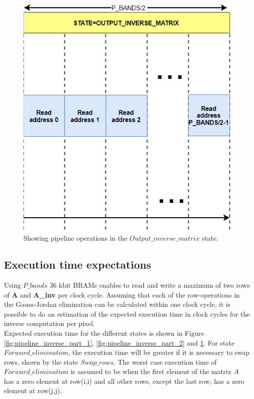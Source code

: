\begin{figure}[H]
\centering

   \includegraphics[scale=0.5]{images/estimation_execution_time/pipeline_inverse_matrix_part_3.PNG}
  \caption{Showing pipeline operations in the $Output\_inverse\_matrix$ state.  } 
  \label{fig:pipeline_inverse_part_3}
\end{figure}



\subsection{Execution time expectations}
Using $P\_bands$ 36 kbit BRAMs enables to read and write a maximum of two rows of \textbf{A} and \textbf{A\_inv} per clock cycle.  Assuming that each of the row-operations in the Gauss-Jordan elimination can be calculated within one clock cycle, it is possible to do an estimation of the expected execution time in clock cycles for the inverse computation per pixel. \\

Expected execution time for the different states is shown in Figure \ref{fig:pipeline_inverse_part_1}, \ref{fig:pipeline_inverse_part_2} and \ref{fig:pipeline_inverse_part_3}. For state $Forward\_elimination$, the execution time will be greater if it is necessary to swap rows, shown by the state $Swap\_rows$. The worst case execution time of $Forward\_elimination$ is assumed to be when the first element of the matrix $A$ has a zero element at row(i,i) and all other rows, except the last row, has a zero element at row(j,j). \\

